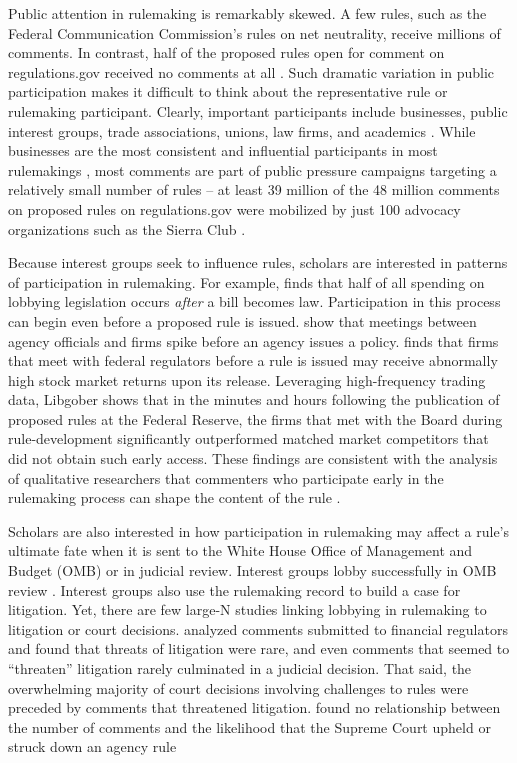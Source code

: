 \documentclass[
      12pt,
        ]{article}
\begin{document}
Public attention in rulemaking is remarkably skewed. A few rules, such
as the Federal Communication Commission's rules on net neutrality,
receive millions of comments. In contrast, half of the proposed rules
open for comment on regulations.gov received no comments at all
\citep{LibgoberJOP}. Such dramatic variation in public participation
makes it difficult to think about the representative rule or rulemaking
participant. Clearly, important participants include businesses, public
interest groups, trade associations, unions, law firms, and academics
\citep{CuellarALR2005, YackeeJOP2006}. While businesses are the most
consistent and influential participants in most rulemakings
\citep{YackeeJOP2006, LibgoberJOP}, most comments are part of public
pressure campaigns targeting a relatively small number of rules -- at
least 39 million of the 48 million comments on proposed rules on
regulations.gov were mobilized by just 100 advocacy organizations such
as the Sierra Club \citep{judgelord2019SPSA}.

Because interest groups seek to influence rules, scholars are interested
in patterns of participation in rulemaking. For example,
\citet{YouJOP2017} finds that half of all spending on lobbying
legislation occurs \emph{after} a bill becomes law. Participation in
this process can begin even before a proposed rule is issued.
\citet{deFigureidoKimICC2004} show that meetings between agency
officials and firms spike before an agency issues a policy.
\citet{LibgoberQJPS} finds that firms that meet with federal regulators
before a rule is issued may receive abnormally high stock market returns
upon its release. Leveraging high-frequency trading data, Libgober shows
that in the minutes and hours following the publication of proposed
rules at the Federal Reserve, the firms that met with the Board during
rule-development significantly outperformed matched market competitors
that did not obtain such early access. These findings are consistent
with the analysis of qualitative researchers that commenters who
participate early in the rulemaking process can shape the content of the
rule \citep{NaughtonJPAM2009}.

Scholars are also interested in how participation in rulemaking may
affect a rule's ultimate fate when it is sent to the White House Office
of Management and Budget (OMB) or in judicial review. Interest groups
lobby successfully in OMB review \citep{HaederAPSR2015}. Interest groups
also use the rulemaking record to build a case for litigation. Yet,
there are few large-N studies linking lobbying in rulemaking to
litigation or court decisions. \citet{LibgoberRashin2018SPSA} analyzed
comments submitted to financial regulators and found that threats of
litigation were rare, and even comments that seemed to ``threaten''
litigation rarely culminated in a judicial decision. That said, the
overwhelming majority of court decisions involving challenges to rules
were preceded by comments that threatened litigation.
\citet{judgelord2016MPSA} found no relationship between the number of
comments and the likelihood that the Supreme Court upheld or struck down
an agency rule
\end{document}
